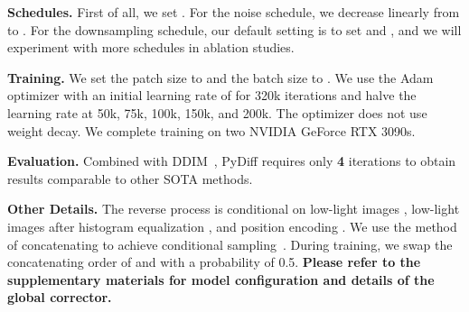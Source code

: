 \documentclass{article}
\begin{document}
\noindent \textbf{Schedules.}
First of all, we set . For the noise schedule, we decrease  linearly from  to . For the downsampling schedule, our default setting is to set  and , and we will experiment with more schedules in ablation studies.



\noindent \textbf{Training.}
We set the patch size to  and the batch size to . We use the Adam optimizer with an initial learning rate of  for 320k iterations and halve the learning rate at 50k, 75k, 100k, 150k, and 200k. The optimizer does not use weight decay. We complete training on two NVIDIA GeForce RTX 3090s.

\noindent \textbf{Evaluation.}
Combined with DDIM~\cite{song2020denoising}, PyDiff requires only \textbf{4} iterations to obtain results comparable to other SOTA methods.


\noindent \textbf{Other Details.}
The reverse process is conditional on low-light images , low-light images after histogram equalization , and position encoding . We use the method of concatenating to achieve conditional sampling~\cite{saharia2022image,saharia2022palette}. During training, we swap the concatenating order of  and  with a probability of 0.5. \textbf{Please refer to the supplementary materials for model configuration and details of the global corrector.}


\begin{table}[tb]  

\setlength{\tabcolsep}{3pt}
        \renewcommand{\arraystretch}{0.9} \centering
	\small
                    
	\caption{Quantitative results on the LOLV2 REAL PART in terms of PSNR, SSIM, and LPIPS. All methods involved in the comparison were not retrained on the corresponding training set.  () denotes that larger (smaller) values lead to better quality.}
	\label{tab:LOLV2_real}
\end{table}
\end{document}
